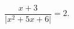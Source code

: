 \begin{ex}[type=equation]
	\begin{condition}
		$\dfrac{x+3}{\big|x^2 + 5x + 6\big|} = 2.$
	\end{condition}
\end{ex}